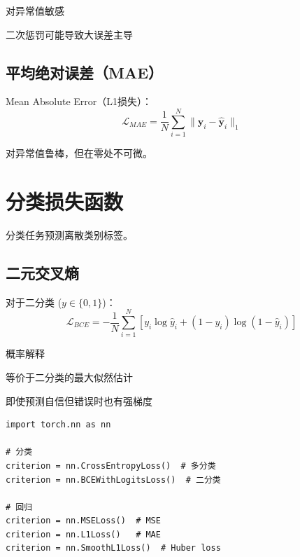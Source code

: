 \begin{disadvantages}
    \item 对异常值敏感
    \item 二次惩罚可能导致大误差主导
\end{disadvantages}

\subsection{平均绝对误差（MAE）}

Mean Absolute Error（L1损失）：
\begin{equation}
\mathcal{L}_{MAE} = \frac{1}{N}\sum_{i=1}^{N} \|\mathbf{y}_i - \hat{\mathbf{y}}_i\|_1
\end{equation}

对异常值鲁棒，但在零处不可微。

\section{分类损失函数}

分类任务预测离散类别标签。

\subsection{二元交叉熵}

对于二分类 ($y \in \{0, 1\}$)：
\begin{equation}
\mathcal{L}_{BCE} = -\frac{1}{N}\sum_{i=1}^{N}[y_i \log \hat{y}_i + (1-y_i) \log(1-\hat{y}_i)]
\end{equation}

\begin{advantages}
    \item 概率解释
    \item 等价于二分类的最大似然估计
    \item 即使预测自信但错误时也有强梯度
\end{advantages}

\begin{code}
    \label{code:loss_chinese}
\begin{verbatim}
import torch.nn as nn

# 分类
criterion = nn.CrossEntropyLoss()  # 多分类
criterion = nn.BCEWithLogitsLoss()  # 二分类

# 回归
criterion = nn.MSELoss()  # MSE
criterion = nn.L1Loss()   # MAE
criterion = nn.SmoothL1Loss()  # Huber loss
\end{verbatim}
\end{code}

